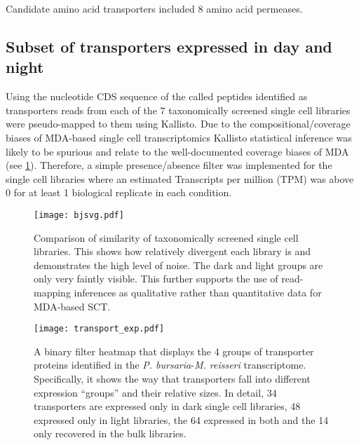Candidate amino acid transporters included 8 amino acid
permeases.
%

\subsection{Subset of transporters expressed in day and night}

Using the nucleotide CDS sequence of the called peptides identified as transporters
reads from each of the 7 taxonomically screened single cell libraries were pseudo-mapped
to them using Kallisto. 
Due to the compositional/coverage biases of MDA-based single cell transcriptomics 
Kallisto statistical inference was likely to be spurious and relate to the 
well-documented coverage biases of MDA (see \cref{fig:jsd}). Therefore, a simple presence/absence
filter was implemented for the single cell libraries where an estimated
Transcripts per million (TPM) was above 0 for at least 1 biological replicate
in each condition. 

\begin{figure}
    \centering
    \texttt{[image: bjsvg.pdf]}
    \caption[Jasper-shannon divergence of single cell transcriptome libraries]{Comparison of similarity of 
    taxonomically screened single cell libraries.  This shows how relatively divergent
each library is and demonstrates the high level of noise.  The dark and light groups
are only very faintly visible.  This further supports the use of read-mapping inferences
as qualitative rather than quantitative data for MDA-based SCT.}
\label{fig:jsd}
\end{figure}

 \begin{figure}
     \centering
     \texttt{[image: transport\_exp.pdf]}
     \caption[Binary filter map of transporter expression between day and night]{A binary filter heatmap that displays the 4 groups of transporter
         proteins identified in the \textit{P. bursaria}-\textit{M. reisseri} 
         transcriptome.  Specifically, it shows the way that transporters
         fall into different expression ``groups'' and their relative sizes.
         In detail, 34 transporters are expressed only
         in dark single cell libraries, 48 expressed only in light libraries, the 64
         expressed in both and the 14 only recovered in the bulk libraries.}
     \label{fig:binary_expression_heatmap}
 \end{figure}


